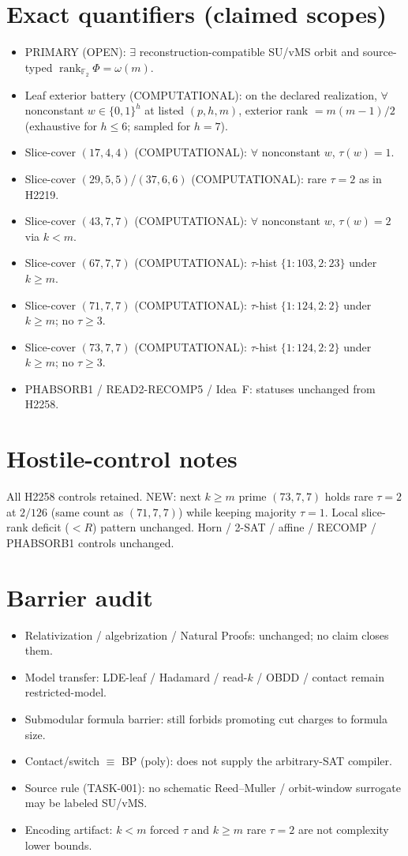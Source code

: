 \documentclass[11pt]{article}
\begin{document}
\section*{Exact quantifiers (claimed scopes)}
\begin{itemize}
\item PRIMARY (OPEN): $\exists$ reconstruction-compatible SU/vMS orbit and source-typed
  $\operatorname{rank}_{\mathbb F_2}\Phi=\omega(m)$.
\item Leaf exterior battery (COMPUTATIONAL): on the declared realization, $\forall$ nonconstant
  $w\in\{0,1\}^h$ at listed $(p,h,m)$, exterior rank $=m(m-1)/2$
  (exhaustive for $h\le6$; sampled for $h{=}7$).
\item Slice-cover $(17,4,4)$ (COMPUTATIONAL): $\forall$ nonconstant $w$, $\tau(w)=1$.
\item Slice-cover $(29,5,5)$/$(37,6,6)$ (COMPUTATIONAL): rare $\tau{=}2$ as in H2219.
\item Slice-cover $(43,7,7)$ (COMPUTATIONAL): $\forall$ nonconstant $w$, $\tau(w)=2$ via $k{<}m$.
\item Slice-cover $(67,7,7)$ (COMPUTATIONAL): $\tau$-hist $\{1{:}103,2{:}23\}$ under $k{\ge}m$.
\item Slice-cover $(71,7,7)$ (COMPUTATIONAL): $\tau$-hist $\{1{:}124,2{:}2\}$ under $k{\ge}m$;
  no $\tau{\ge}3$.
\item Slice-cover $(73,7,7)$ (COMPUTATIONAL): $\tau$-hist $\{1{:}124,2{:}2\}$ under $k{\ge}m$;
  no $\tau{\ge}3$.
\item PHABSORB1 / READ2-RECOMP5 / Idea~F: statuses unchanged from H2258.
\end{itemize}

\section*{Hostile-control notes}
All H2258 controls retained. NEW: next $k{\ge}m$ prime $(73,7,7)$ holds rare
$\tau{=}2$ at $2/126$ (same count as $(71,7,7)$) while keeping majority $\tau{=}1$.
Local slice-rank deficit ($<R$) pattern unchanged. Horn / 2-SAT / affine / RECOMP /
PHABSORB1 controls unchanged.

\section*{Barrier audit}
\begin{itemize}
\item Relativization / algebrization / Natural Proofs: unchanged; no claim closes them.
\item Model transfer: LDE-leaf / Hadamard / read-$k$ / OBDD / contact remain restricted-model.
\item Submodular formula barrier: still forbids promoting cut charges to formula size.
\item Contact/switch $\equiv$ BP (poly): does not supply the arbitrary-SAT compiler.
\item Source rule (TASK-001): no schematic Reed--Muller / orbit-window surrogate may be labeled SU/vMS.
\item Encoding artifact: $k{<}m$ forced $\tau$ and $k{\ge}m$ rare $\tau{=}2$ are not complexity lower bounds.
\end{itemize}
\end{document}
